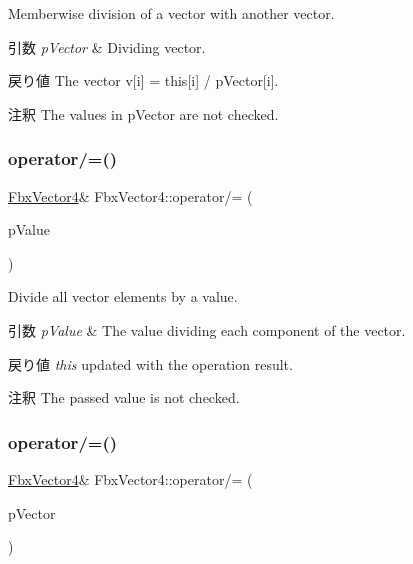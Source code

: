 Memberwise division of a vector with another vector. 
\begin{DoxyParams}{引数}
{\em p\+Vector} & Dividing vector. \\
\hline
\end{DoxyParams}
\begin{DoxyReturn}{戻り値}
The vector v\mbox{[}i\mbox{]}\textquotesingle{} = this\mbox{[}i\mbox{]} / p\+Vector\mbox{[}i\mbox{]}. 
\end{DoxyReturn}
\begin{DoxyRemark}{注釈}
The values in p\+Vector are not checked. 
\end{DoxyRemark}
\mbox{\label{class_fbx_vector4_a70953f7aa47d51868a3a9020a982b749}} 
\subsubsection{\texorpdfstring{operator/=()}{operator/=()}\hspace{0.1cm}{\footnotesize\ttfamily [1/2]}}
{\footnotesize\ttfamily \hyperlink{class_fbx_vector4}{Fbx\+Vector4}\& Fbx\+Vector4\+::operator/= (\begin{DoxyParamCaption}\item[{double}]{p\+Value }\end{DoxyParamCaption})}

Divide all vector elements by a value. 
\begin{DoxyParams}{引数}
{\em p\+Value} & The value dividing each component of the vector. \\
\hline
\end{DoxyParams}
\begin{DoxyReturn}{戻り値}
{\itshape this} updated with the operation result. 
\end{DoxyReturn}
\begin{DoxyRemark}{注釈}
The passed value is not checked. 
\end{DoxyRemark}
\mbox{\label{class_fbx_vector4_a949819573b3bcb8b8fa1185c81aa6671}} 
\subsubsection{\texorpdfstring{operator/=()}{operator/=()}\hspace{0.1cm}{\footnotesize\ttfamily [2/2]}}
{\footnotesize\ttfamily \hyperlink{class_fbx_vector4}{Fbx\+Vector4}\& Fbx\+Vector4\+::operator/= (\begin{DoxyParamCaption}\item[{const \hyperlink{class_fbx_vector4}{Fbx\+Vector4} \&}]{p\+Vector }\end{DoxyParamCaption})}

